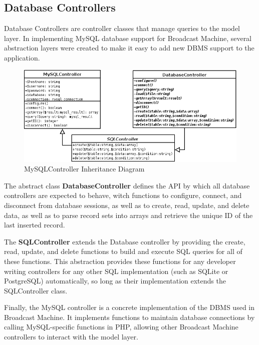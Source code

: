 \documentclass[a4paper,12pt]{report}
\begin{document}
\subsection*{Database Controllers}
Database Controllers are controller classes that manage queries to the model layer. In implementing MySQL database support for Broadcast Machine, several abstraction layers were created to make it easy to add new DBMS support to the application.
\begin{figure}[h]
\begin{center}
\includegraphics[scale=0.5]{./images/mysql.png}
\end{center}
\caption{MySQLController Inheritance Diagram}
\end{figure}

The abstract class \textbf{DatabaseController} defines the API by which all database controllers are expected to behave, witch functions to configure, connect, and disconnect from database sessions, as well as to create, read, update, and delete data, as well as to parse record sets into arrays and retrieve the unique ID of the last inserted record.

The \textbf{SQLController} extends the Database controller by providing the create, read, update, and delete functions to build and execute SQL queries for all of these functions. This abstraction provides these functions for any developer writing controllers for any other SQL implementation (such as SQLite or PostgreSQL) automatically, so long as their implementation extends the SQLController class.

Finally, the MySQL controller is a concrete implementation of the DBMS used in Broadcast Machine. It implements functions to maintain database connections by calling MySQL-specific functions in PHP, allowing other Broadcast Machine controllers to interact with the model layer.
\end{document}

